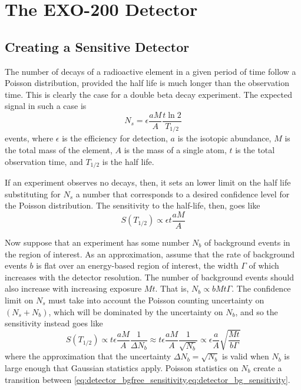 \documentclass[herrin-thesis.tex]{subfiles}
\begin{document}
\chapter{The EXO-200 Detector}
\label{ch:detector}

\section{Creating a Sensitive Detector}
\label{sec:detector_sensitivity}
The number of decays of a radioactive element in a given period of time follow a Poisson distribution, provided the half life is much longer than the observation time. This is clearly the case for a double beta decay experiment. The expected signal in such a case is
\begin{equation}
N_{s} = \epsilon \frac{a M}{A} \frac{t \ln2}{T_{1/2}}
\label{eq:detector_N_expected}
\end{equation}
events, where  \(\epsilon\) is the efficiency for detection, \(a\) is the isotopic abundance, \(M\) is the total mass of the element, \(A\) is the mass of a single atom, \(t\) is the total observation time, and \(T_{1/2}\) is the half life.

If an experiment observes no decays, then, it sets an lower limit on the half life substituting for \(N_s\) a number that corresponds to a desired confidence level for the Poisson distribution. The sensitivity to the half-life, then, goes like
\begin{equation}
S(T_{1/2}) \propto \epsilon t \frac{a M}{A}
\label{eq:detector_bgfree_sensitivity}
\end{equation}

Now suppose that an experiment has some number \(N_b\) of background events in the region of interest. As an approximation, assume that the rate of background events \(b\) is flat over an energy-based region of interest, the width \(\Gamma\) of which increases with the detector resolution. The number of background events should also increase with increasing exposure \(M t\). That is, \(N_b \propto b M t \Gamma\). The confidence limit on \(N_s\) must take into account the Poisson counting uncertainty on \((N_s + N_b)\), which will be dominated by the uncertainty on \(N_b\), and so the sensitivity instead goes like
\begin{equation}
S(T_{1/2}) \propto t \epsilon \frac{a M}{A} \frac{1}{\Delta N_b} \approx t \epsilon \frac{a M}{A} \frac{1}{\sqrt{N_b}} \propto \epsilon \frac{a}{A} \sqrt{\frac{M t}{b \Gamma}}
\label{eq:detector_bg_sensitivity}
\end{equation}
where the approximation that the uncertainty \(\Delta N_b = \sqrt{N_b}\) is valid when \(N_b\) is large enough that Gaussian statistics apply. Poisson statistics on \(N_b\) create a transition between \cref{eq:detector_bgfree_sensitivity,eq:detector_bg_sensitivity}.
\end{document}

